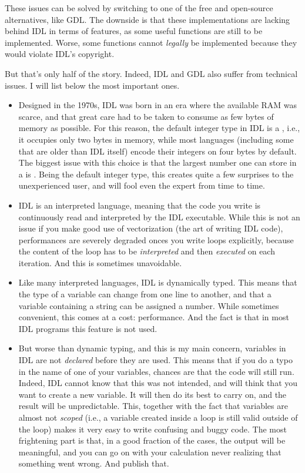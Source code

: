 \documentclass[12pt]{report}
\begin{document}
These issues can be solved by switching to one of the free and open-source alternatives, like GDL. The downside is that these implementations are lacking behind IDL in terms of features, as some useful functions are still to be implemented. Worse, some functions cannot \emph{legally} be implemented because they would violate IDL's copyright.

But that's only half of the story. Indeed, IDL and GDL also suffer from technical issues. I will list below the most important ones.
\begin{itemize}
\item Designed in the 1970s, IDL was born in an era where the available RAM was scarce, and that great care had to be taken to consume as few bytes of memory as possible. For this reason, the default integer type in IDL is a , i.e., it occupies only two bytes in memory, while most languages (including some that are older than IDL itself) encode their integers on four bytes by default. The biggest issue with this choice is that the largest number one can store in a  is . Being the default integer type, this creates quite a few surprises to the unexperienced user, and will fool even the expert from time to time.
\item IDL is an interpreted language, meaning that the code you write is continuously read and interpreted by the IDL executable. While this is not an issue if you make good use of vectorization (the art of writing IDL code), performances are severely degraded onces you write loops explicitly, because the content of the loop has to be \emph{interpreted} and then \emph{executed} on each iteration. And this is sometimes unavoidable.
\item Like many interpreted languages, IDL is dynamically typed. This means that the type of a variable can change from one line to another, and that a variable containing a string can be assigned a number. While sometimes convenient, this comes at a cost: performance. And the fact is that in most IDL programs this feature is not used.
\item But worse than dynamic typing, and this is my main concern, variables in IDL are not \emph{declared} before they are used. This means that if you do a typo in the name of one of your variables, chances are that the code will still run. Indeed, IDL cannot know that this was not intended, and will think that you want to create a new variable. It will then do its best to carry on, and the result will be unpredictable. This, together with the fact that variables are almost not \emph{scoped} (i.e., a variable created inside a  loop is still valid outside of the loop) makes it very easy to write confusing and buggy code. The most frightening part is that, in a good fraction of the cases, the output will be meaningful, and you can go on with your calculation never realizing that something went wrong. And publish that.
\end{itemize}
\end{document}
